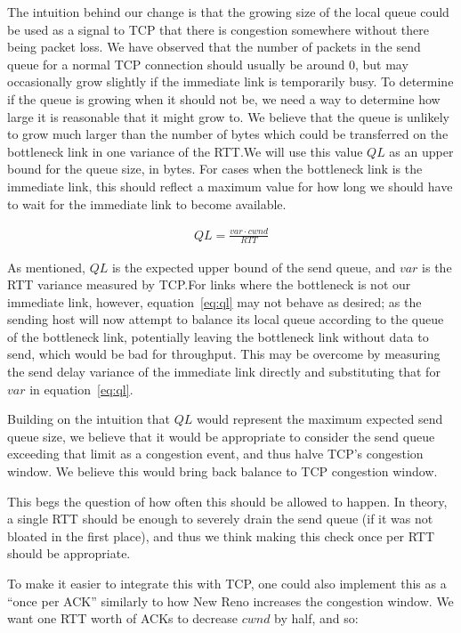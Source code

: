 The intuition behind our change is that the growing size of the local queue
could be used as a signal to TCP that there is congestion somewhere without
there being packet loss.
We have observed that the number of packets in the send queue for a normal
TCP connection should usually be around 0, but may occasionally grow slightly if
the immediate link is temporarily busy. To determine if the queue is growing
when it should not be, we need a way to determine how large it is reasonable
that it might grow to. We believe that the queue is unlikely to grow much
larger than the number of bytes which could be transferred on the bottleneck link
in one variance of the RTT.\@ We will use this value $QL$ as an upper bound for
the queue size, in bytes. For cases when the bottleneck link is the
immediate link, this should reflect a maximum value for how long we
should have to wait for the immediate link to become available.

\begin{align}
  QL = \frac{var \cdot cwnd}{RTT}\label{eq:ql}
\end{align}

As mentioned, $QL$ is the expected upper bound of the send queue, and $var$ is the RTT
variance measured by TCP.\@ For links where the bottleneck is not our immediate
link, however, equation~\ref{eq:ql} may not behave as desired; as the sending
host will now attempt to balance its local queue according to the queue of the
bottleneck link, potentially leaving the bottleneck link without
data to send, which would be bad for throughput. This may be overcome by
measuring the send delay variance of the immediate link directly and
substituting that for $var$ in equation~\ref{eq:ql}.

Building on the intuition that $QL$ would represent the maximum expected send
queue size, we believe that it would be appropriate to consider the send queue
exceeding that limit as a congestion event, and thus halve TCP's congestion
window. We believe this would bring back balance to TCP congestion window.

This begs the question of how often this should be allowed to happen. In theory,
a single RTT should be enough to severely drain the send queue (if it was not
bloated in the first place), and thus we think making this check once per RTT
should be appropriate.

To make it easier to integrate this with TCP, one could also implement this as a
``once per ACK'' similarly to how New Reno increases the congestion
window. We want one RTT worth of ACKs to decrease $cwnd$ by half, and so:

